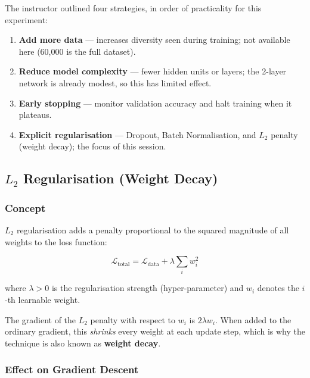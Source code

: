 \documentclass[12pt,a4paper]{article}
\newcommand{\Ltwo}{L_2}
\begin{document}
The instructor outlined four strategies, in order of practicality for this
experiment:

\begin{enumerate}[label=\textbf{S\arabic*.}]
  \item \textbf{Add more data} --- increases diversity seen during training;
        not available here (60{,}000 is the full dataset).
  \item \textbf{Reduce model complexity} --- fewer hidden units or layers;
        the 2-layer network is already modest, so this has limited effect.
  \item \textbf{Early stopping} --- monitor validation accuracy and halt
        training when it plateaus.
  \item \textbf{Explicit regularisation} --- Dropout, Batch Normalisation,
        and $\Ltwo$ penalty (weight decay); the focus of this session.
\end{enumerate}

\subsection{\texorpdfstring{$\Ltwo$}{L2} Regularisation (Weight Decay)}
\label{sec:regularisation:l2}

\subsubsection{Concept}
\label{sec:regularisation:l2:concept}

$\Ltwo$ regularisation adds a penalty proportional to the squared magnitude
of all weights to the loss function:

\begin{equation}
  \label{eq:l2_loss}
  \mathcal{L}_{\text{total}}
    = \mathcal{L}_{\text{data}}
    + \lambda \sum_{i} w_i^2
\end{equation}

where $\lambda > 0$ is the regularisation strength (hyper-parameter) and
$w_i$ denotes the $i$-th learnable weight.

\begin{keyinsight}
  The gradient of the $\Ltwo$ penalty with respect to $w_i$ is $2\lambda
  w_i$.  When added to the ordinary gradient, this \emph{shrinks} every
  weight at each update step, which is why the technique is also known as
  \textbf{weight decay}.
\end{keyinsight}

\subsubsection{Effect on Gradient Descent}
\label{sec:regularisation:l2:grad}
\end{document}
